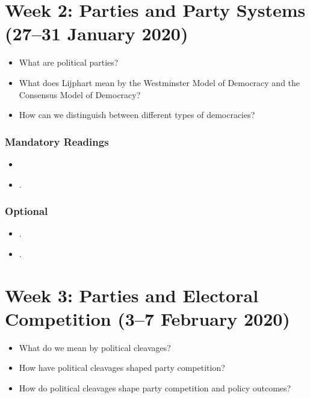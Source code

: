 \documentclass[abstract=on,parskip=full,headings=standardclasses,fontsize=11pt,paper=a4]{scrartcl}
\begin{document}
\section{Week 2: Parties and Party Systems (27--31 January 2020)}

\begin{itemize}
\renewcommand\labelitemi{--}
\item  What are political parties?
\item What does Lijphart mean by the Westminster Model of Democracy and the Consensus Model of Democracy?
\item How can we distinguish between different types of democracies?
\end{itemize}

\subsubsection*{Mandatory Readings}
\begin{itemize}
\item {}
\item {}.
\end{itemize}



\subsubsection*{Optional}
\begin{itemize}
\item {}.
\item {}.
\end{itemize}



\section{Week 3: Parties and Electoral Competition (3--7 February 2020)}

\begin{itemize}
\renewcommand\labelitemi{--}
\item  What do we mean by political cleavages?
\item How have political cleavages shaped party competition? 
\item How do political cleavages shape party competition and policy outcomes?
\end{itemize}
\end{document}
